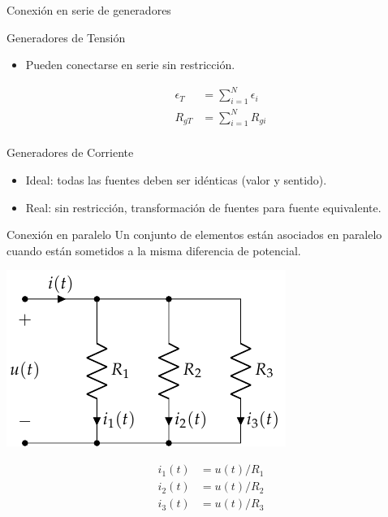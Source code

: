 \documentclass[aspectratio=169, usenames,svgnames,dvipsnames]{beamer}
\begin{document}
\begin{frame}[label={sec:orgac0e291}]{Conexión en serie de generadores}
\begin{block}{Generadores de Tensión}
\begin{itemize}
\item Pueden conectarse en serie sin restricción.

\begin{align*}
  \epsilon_T &= \sum_{i = 1}^N \epsilon_i\\
  R_{gT} &= \sum_{i = 1}^N R_{gi}\\ 
\end{align*}
\end{itemize}
\end{block}
\begin{block}{Generadores de Corriente}
\begin{itemize}
\item Ideal: todas las fuentes deben ser idénticas (valor y sentido).
\item Real:  sin restricción, transformación de fuentes para fuente equivalente.
\end{itemize}
\end{block}
\end{frame}
\begin{frame}[label={sec:orgaa1c768}]{Conexión en paralelo}
Un conjunto de elementos están asociados en paralelo cuando están sometidos a la misma diferencia de potencial.
\begin{center}
\includegraphics[height=0.45\textheight]{../figs/AsociacionParalelo.pdf}
\end{center}

\begin{align*}
  i_1(t) &= u(t)/R_1\\
  i_2(t) &= u(t)/R_2\\
  i_3(t) &= u(t)/R_3
\end{align*}
\end{frame}
\end{document}
